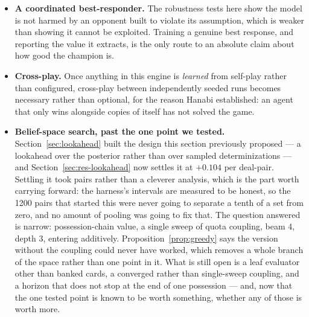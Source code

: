 \documentclass[11pt,a4paper]{article}
\begin{document}
\begin{itemize}
That is the useful bound on the expensive version. The cheap form of this idea,
at the one exponent where the model is correctly specified, buys about a tenth
of a set. Paying a constant factor in the sampler to reach $\alpha = 2.195$ has
to beat that by enough to be worth the sampler time it takes away from draws ---
and draws are the largest measured effect in this study. We would now want a
sizing argument for that trade before writing the code, not after.

A fixpoint is still not required, and that is the substantive update: the
opponent being modelled is a policy whose choice rule can be fitted directly
from its own play.
\item \textbf{A coordinated best-responder.} The robustness tests here show the
model is not harmed by an opponent built to violate its assumption, which is
weaker than showing it cannot be exploited. Training a genuine best response,
and reporting the value it extracts, is the only route to an absolute claim
about how good the champion is.
\item \textbf{Cross-play.} Once anything in this engine is \emph{learned} from
self-play rather than configured, cross-play between independently seeded runs
becomes necessary rather than optional, for the reason Hanabi established: an
agent that only wins alongside copies of itself has not solved the game.
\item \textbf{Belief-space search, past the one point we tested.}
Section~\ref{sec:lookahead} built the design this section previously proposed
--- a lookahead over the posterior rather than over sampled determinizations ---
and Section~\ref{sec:res-lookahead} now settles it at $+0.104$ per deal-pair.
Settling it took pairs rather than a cleverer analysis, which is the part worth
carrying forward: the harness's intervals are measured to be honest, so the
1200 pairs that started this were never going to separate a tenth of a set from
zero, and no amount of pooling was going to fix that. The question answered is
narrow: possession-chain value, a single sweep of quota coupling, beam $4$,
depth $3$, entering additively. Proposition~\ref{prop:greedy} says the version
without the coupling could never have worked, which removes a whole branch of
the space rather than one point in it. What is still open is a leaf evaluator
other than banked cards, a converged rather than single-sweep coupling, and a
horizon that does not stop at the end of one possession --- and, now that the
one tested point is known to be worth something, whether any of those is worth
more.
\end{itemize}
\end{document}
